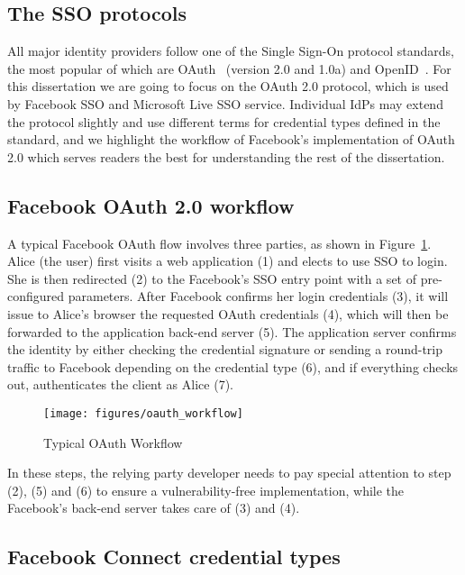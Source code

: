 \subsection{The SSO protocols}
\label{sec:bg_sso_protocol}
All major identity providers follow one of the Single Sign-On protocol standards, the most popular of which are OAuth~\cite{OAuth2.0} (version 2.0 and 1.0a) and OpenID~\cite{openID}.  For this dissertation we are going to focus on the OAuth 2.0 protocol, which is used by Facebook SSO and Microsoft Live SSO service.  Individual IdPs may extend the protocol slightly and use different terms for credential types defined in the standard, and we highlight the workflow of Facebook's implementation of OAuth 2.0 which serves readers the best for understanding the rest of the dissertation.

\subsection{Facebook OAuth 2.0 workflow}

A typical Facebook OAuth flow involves three parties, as shown in Figure~\ref{fig:oauth_workflow}.  Alice (the user) first visits a web application (1) and elects to use SSO to login.  She is then redirected (2) to the Facebook's SSO entry point with a set of pre-configured parameters.  After Facebook confirms her login credentials (3), it will issue to Alice's browser the requested OAuth credentials (4), which will then be forwarded to the application back-end server (5).  The application server confirms the identity by either checking the credential signature or sending a round-trip traffic to Facebook depending on the credential type (6), and if everything checks out, authenticates the client as Alice (7).

\begin{figure}[bth]
\centering
\texttt{[image: figures/oauth\_workflow]}
\caption{Typical OAuth Workflow}
\label{fig:oauth_workflow}
\end{figure}

In these steps, the relying party developer needs to pay special attention to step (2), (5) and (6) to ensure a vulnerability-free implementation, while the Facebook's back-end server takes care of (3) and (4).

\subsection{Facebook Connect credential types}

